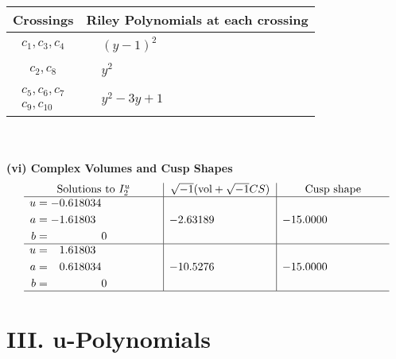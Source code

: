 \documentclass[1p]{elsarticle_modified}
\theoremstyle{definition}
\newcommand{\I}{\sqrt{-1}}
\begin{document}
\begin{tabular}{m{50pt}|m{274pt}}
Crossings & \hspace{64pt}Riley Polynomials at each crossing \\
\hline $$\begin{aligned}c_{1},c_{3},c_{4}\end{aligned}$$&$\begin{aligned}
&(y-1)^2
\end{aligned}$\\
\hline $$\begin{aligned}c_{2},c_{8}\end{aligned}$$&$\begin{aligned}
&y^2
\end{aligned}$\\
\hline $$\begin{aligned}c_{5},c_{6},c_{7}\\c_{9},c_{10}\end{aligned}$$&$\begin{aligned}
&y^2-3 y+1
\end{aligned}$\\
\hline
\end{tabular}\\~\\
\newpage\flushleft \textbf{(vi) Complex Volumes and Cusp Shapes}
$$\begin{array}{c|c|c}  
\text{Solutions to }I^u_{2}& \I (\text{vol} + \sqrt{-1}CS) & \text{Cusp shape}\\
 \hline 
\begin{aligned}
u &= -0.618034\phantom{ +0.000000I} \\
a &= -1.61803\phantom{ +0.000000I} \\
b &= \phantom{-0.000000 } 0\end{aligned}
 & -2.63189\phantom{ +0.000000I} & -15.0000\phantom{ +0.000000I} \\ \hline\begin{aligned}
u &= \phantom{-}1.61803\phantom{ +0.000000I} \\
a &= \phantom{-}0.618034\phantom{ +0.000000I} \\
b &= \phantom{-0.000000 } 0\end{aligned}
 & -10.5276\phantom{ +0.000000I} & -15.0000\phantom{ +0.000000I}\\
 \hline 
 \end{array}$$\newpage
\newpage\renewcommand{\arraystretch}{1}
\centering \section*{ III. u-Polynomials}
\end{document}
